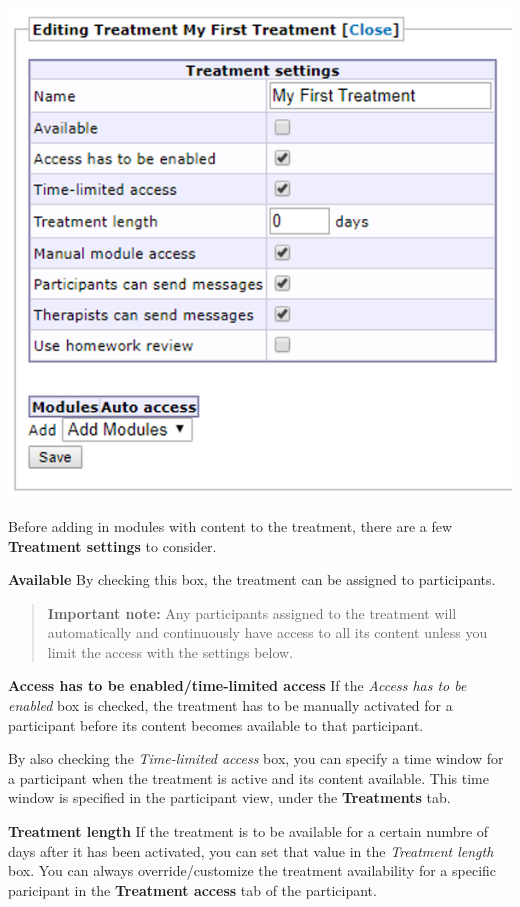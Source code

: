 \documentclass[]{book}
\begin{document}
\includegraphics{images/new-images/treatmentTreatSettings.png}

Before adding in modules with content to the treatment, there are a few \textbf{Treatment settings} to consider.

\textbf{Available}
By checking this box, the treatment can be assigned to participants.

\begin{quote}
\textbf{Important note:} Any participants assigned to the treatment will automatically and continuously have access to all its content unless you limit the access with the settings below.
\end{quote}

\textbf{Access has to be enabled/time-limited access}
If the \emph{Access has to be enabled} box is checked, the treatment has to be manually activated for a participant before its content becomes available to that participant.

By also checking the \emph{Time-limited access} box, you can specify a time window for a participant when the treatment is active and its content available. This time window is specified in the participant view, under the \textbf{Treatments} tab.

\textbf{Treatment length}
If the treatment is to be available for a certain numbre of days after it has been activated, you can set that value in the \emph{Treatment length} box. You can always override/customize the treatment availability for a specific paricipant in the \textbf{Treatment access} tab of the participant.
\end{document}
